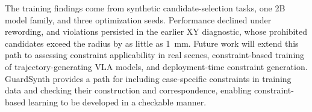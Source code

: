 The training findings come from synthetic candidate-selection tasks, one 2B
model family, and three optimization seeds. Performance declined under
rewording, and violations persisted in the earlier XY diagnostic, whose prohibited
candidates exceed the radius by as little as 1~mm. Future work will
extend this path to assessing constraint applicability in real scenes,
constraint-based training of trajectory-generating VLA models, and
deployment-time constraint generation. GuardSynth provides a path for including
case-specific constraints in training data and checking their construction and
correspondence, enabling constraint-based learning to be developed in a
checkable manner.
